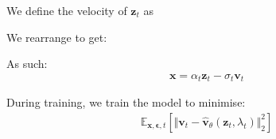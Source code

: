 \documentclass[ oneside,%
                    author={George Herbert},
                    degree={MSci},
                     title={Video Diffusion Models for Climate Simulations},
                  subtitle={}]{dissertation}
\begin{document}
We define the velocity of $\mathbf{z}_t$ as 

We rearrange to get:

As such:
\begin{align}
      \mathbf{x}=\alpha_t\mathbf{z}_t-\sigma_t\mathbf{v}_t
\end{align}

During training, we train the model to minimise:
\begin{align}
      \mathbb{E}_{\mathbf{x},\boldsymbol\epsilon, t}\left[\Vert\mathbf{v}_t-\hat{\mathbf{v}}_\theta(\mathbf{z}_t, \lambda_t)\Vert_2^2\right]
\end{align}

\end{document}
